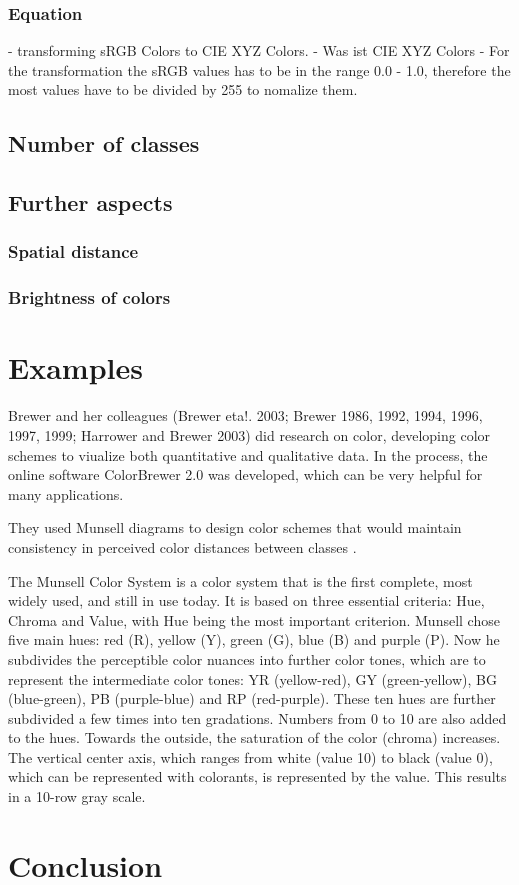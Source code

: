 \subsubsection{Equation}

- transforming sRGB Colors to CIE XYZ Colors. 
- Was ist CIE XYZ Colors
- For the transformation the sRGB values has to be in the range 0.0 - 1.0, therefore the most values have to be divided by 255 to nomalize them. 
\subsection{Number of classes}

\subsection{Further aspects}

\subsubsection{Spatial distance}

\subsubsection{Brightness of colors}

\section{Examples}
Brewer and her colleagues (Brewer eta!. 2003; Brewer 1986, 1992, 1994, 1996, 1997, 1999; Harrower and Brewer 2003) did research on color, developing color schemes to viualize both quantitative and qualitative data. In the process, the online software ColorBrewer 2.0 was developed, which can be very helpful for many applications. 

They used Munsell diagrams to design color schemes that would maintain consistency in perceived color distances between classes \parencite{brychtova2017}. 

The Munsell Color System is a color system that is the first complete, most widely used, and still in use today. It is based on three essential criteria: Hue, Chroma and Value, with Hue being the most important criterion. Munsell chose five main hues: red (R), yellow (Y), green (G), blue (B) and purple (P). Now he subdivides the perceptible color nuances into further color tones, which are to represent the intermediate color tones: YR (yellow-red), GY (green-yellow), BG (blue-green), PB (purple-blue) and RP (red-purple). These ten hues are further subdivided a few times into ten gradations. Numbers from 0 to 10 are also added to the hues. Towards the outside, the saturation of the color (chroma) increases. The vertical center axis, which ranges from white (value 10) to black (value 0), which can be represented with colorants, is represented by the value. This results in a 10-row gray scale.



\section{Conclusion}


\parencite{brychtova2015}
\parencite{brychtova2017}
\parencite{sharma2005}
\parencite{coltekin2015}
\parencite{coltekin2017}

